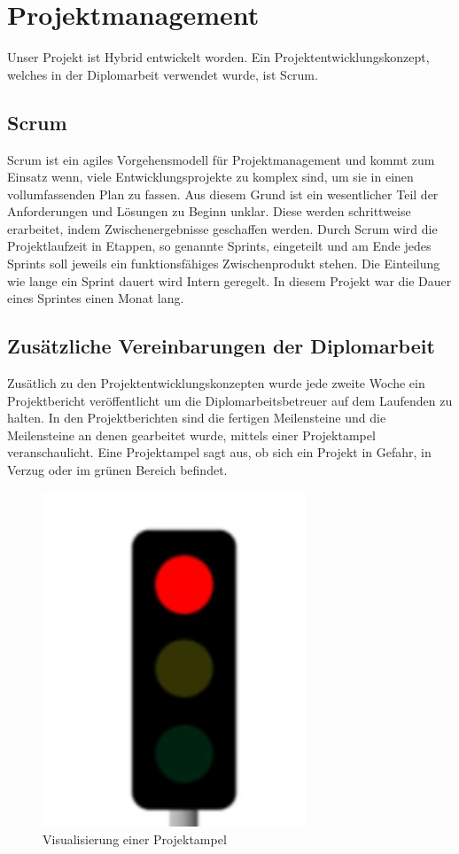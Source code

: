 



\section{Projektmanagement}
Unser Projekt ist Hybrid entwickelt worden. Ein Projektentwicklungskonzept, welches in der Diplomarbeit verwendet wurde, ist Scrum.

\subsection{Scrum}
Scrum ist ein agiles Vorgehensmodell für Projektmanagement
und kommt zum Einsatz wenn, viele Entwicklungsprojekte zu komplex sind, um sie in einen vollumfassenden Plan zu fassen.
Aus diesem Grund ist ein wesentlicher Teil der Anforderungen und Lösungen zu Beginn unklar. 
Diese werden schrittweise erarbeitet, indem Zwischenergebnisse geschaffen werden.
Durch Scrum wird die Projektlaufzeit in Etappen, so genannte Sprints, eingeteilt und
am Ende jedes Sprints soll jeweils ein funktionsfähiges Zwischenprodukt stehen.
Die Einteilung wie lange ein Sprint dauert wird Intern geregelt.
In diesem Projekt war die Dauer eines Sprintes einen Monat lang.

\subsection{Zusätzliche Vereinbarungen der Diplomarbeit}
Zusätlich zu den Projektentwicklungskonzepten wurde jede zweite Woche ein Projektbericht veröffentlicht um die Diplomarbeitsbetreuer auf dem Laufenden zu halten.
In den Projektberichten sind die fertigen Meilensteine und die  Meilensteine an denen gearbeitet wurde, mittels einer Projektampel veranschaulicht.
Eine Projektampel sagt aus, ob sich ein Projekt in Gefahr, in Verzug oder im grünen Bereich befindet.

\begin{figure}[H]
    \centering
    \includegraphics[width=0.7\textwidth]{pics/Projektampel.png}
    \caption{Visualisierung einer Projektampel}
\end{figure}

